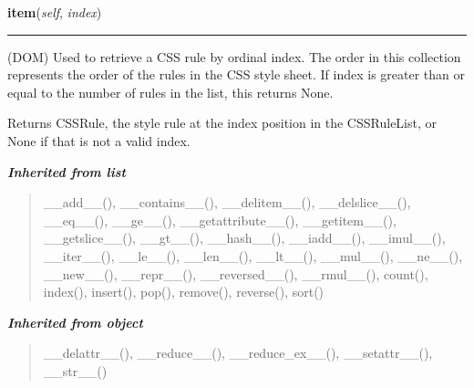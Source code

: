     \label{cssutils:css:cssrulelist:CSSRuleList:item}

    \vspace{0.5ex}

\hspace{.8\funcindent}\begin{boxedminipage}{\funcwidth}

    \raggedright \textbf{item}(\textit{self}, \textit{index})

    \vspace{-1.5ex}

    \rule{\textwidth}{0.5\fboxrule}
\setlength{\parskip}{2ex}

(DOM)
Used to retrieve a CSS rule by ordinal index. The order in this
collection represents the order of the rules in the CSS style
sheet. If index is greater than or equal to the number of rules in
the list, this returns None.

Returns CSSRule, the style rule at the index position in the
CSSRuleList, or None if that is not a valid index.
\setlength{\parskip}{1ex}
    \end{boxedminipage}


\large{\textbf{\textit{Inherited from list}}}

\begin{quote}
\_\_add\_\_(), \_\_contains\_\_(), \_\_delitem\_\_(), \_\_delslice\_\_(), \_\_eq\_\_(), \_\_ge\_\_(), \_\_getattribute\_\_(), \_\_getitem\_\_(), \_\_getslice\_\_(), \_\_gt\_\_(), \_\_hash\_\_(), \_\_iadd\_\_(), \_\_imul\_\_(), \_\_iter\_\_(), \_\_le\_\_(), \_\_len\_\_(), \_\_lt\_\_(), \_\_mul\_\_(), \_\_ne\_\_(), \_\_new\_\_(), \_\_repr\_\_(), \_\_reversed\_\_(), \_\_rmul\_\_(), count(), index(), insert(), pop(), remove(), reverse(), sort()
\end{quote}

\large{\textbf{\textit{Inherited from object}}}

\begin{quote}
\_\_delattr\_\_(), \_\_reduce\_\_(), \_\_reduce\_ex\_\_(), \_\_setattr\_\_(), \_\_str\_\_()
\end{quote}


